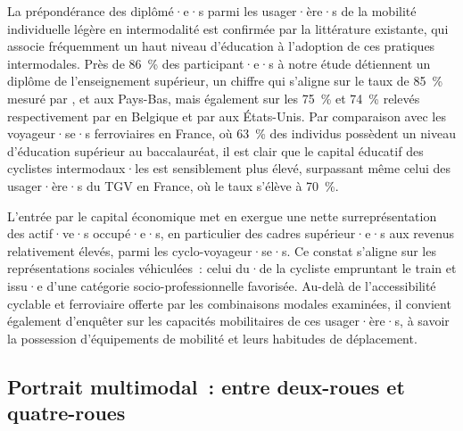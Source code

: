 \begin{refsegment}
La prépondérance des diplômé·e·s parmi les usager·ère·s de la mobilité individuelle légère en intermodalité est confirmée par la littérature existante, qui associe fréquemment un haut niveau d'éducation à l'adoption de ces pratiques intermodales. Près de 86~\% des participant·e·s à notre étude détiennent un diplôme de l'enseignement supérieur, un chiffre qui s'aligne sur le taux de 85~\% mesuré par \textcolor{blue}{\textcite[15]{shelat_analysing_2018}}, \textcolor{blue}{\textcite[113]{heinen_multimodal_2014}} et \textcolor{blue}{\textcite[11]{jonkeren_bicycle-train_2021}} aux Pays-Bas, mais également sur les 75~\% et 74~\% relevés respectivement par \textcolor{blue}{\textcite[6, 8]{adnan_last-mile_2019}} en Belgique et par \textcolor{blue}{\textcite[103]{flamm_public_2014}} aux États-Unis. Par comparaison avec les voyageur·se·s ferroviaires en France, où 63~\% des individus possèdent un niveau d'éducation supérieur au baccalauréat, il est clair que le capital éducatif des cyclistes intermodaux·les est sensiblement plus élevé, surpassant même celui des usager·ère·s du \acrshort{TGV} en France, où le taux s'élève à 70~\%.%

L'entrée par le capital économique met en exergue une nette surreprésentation des actif·ve·s occupé·e·s, en particulier des cadres supérieur·e·s aux revenus relativement élevés, parmi les cyclo-voyageur·se·s. Ce constat s'aligne sur les représentations sociales véhiculées~: celui du·de la cycliste empruntant le train et issu·e d'une catégorie socio-professionnelle favorisée. Au-delà de l'accessibilité cyclable et ferroviaire offerte par les combinaisons modales examinées, il convient également d'enquêter sur les capacités mobilitaires de ces usager·ère·s, à savoir la possession d'équipements de mobilité et leurs habitudes de déplacement.%

\subsection{Portrait multimodal~: entre deux-roues et quatre-roues
    \label{chap4:capital-mobilite}
    }


\end{refsegment}
